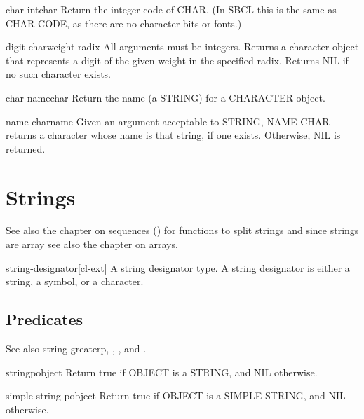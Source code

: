 \documentclass[10pt,english]{book}
\begin{document}
\begin{function}{char-int}{char}
  Return the integer code of CHAR. (In SBCL this is the same as CHAR-CODE, as
   there are no character bits or fonts.)
\end{function}

\begin{function}{digit-char}{weight \op radix}
  All arguments must be integers. Returns a character object that
  represents a digit of the given weight in the specified radix. Returns
  NIL if no such character exists.
\end{function}

\begin{function}{char-name}{char}
  Return the name (a STRING) for a CHARACTER object.
\end{function}

\begin{function}{name-char}{name}
  Given an argument acceptable to STRING, NAME-CHAR returns a character
  whose name is that string, if one exists. Otherwise, NIL is returned.
\end{function}



\chapter{Strings}
\label{cha:strings}

See also the chapter on sequences () for functions to split strings and
since strings are array see also the chapter on arrays.

\begin{type}{string-designator}{}[cl-ext]
  A string designator type. A string designator is either a string, a
  symbol, or a character.
\end{type}

\section{Predicates}
\label{sec:string-predicates}

See also string-greaterp, ,
, and .

\begin{function}{stringp}{object}
  Return true if OBJECT is a STRING, and NIL otherwise.
\end{function}

\begin{function}{simple-string-p}{object}
  Return true if OBJECT is a SIMPLE-STRING, and NIL otherwise.
\end{function}
\end{document}
